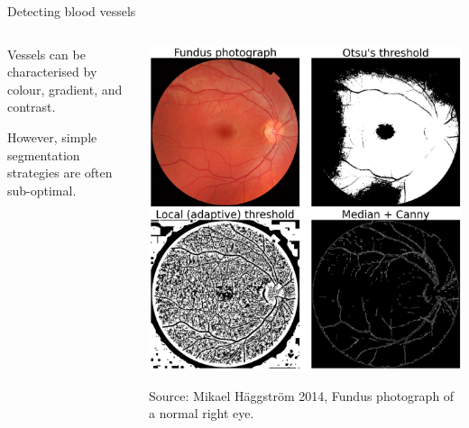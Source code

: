 \documentclass[9pt, aspectratio=169]{beamer}
\begin{document}
\begin{frame}
    {Detecting blood vessels}
    \begin{columns}
        \begin{column}{.5\textwidth}
            Vessels can be characterised by colour, gradient, and contrast.

            However, simple segmentation strategies are often sub-optimal.
        \end{column}
        \begin{column}{.5\textwidth}
            \centering
            \includegraphics[width=\textwidth]{retina_thresholding.png}

            \footnotesize
            \raggedright
            Source: Mikael H\"aggstr\"om 2014, Fundus photograph of a normal right eye.
        \end{column}
    \end{columns}
\end{frame}
\end{document}
